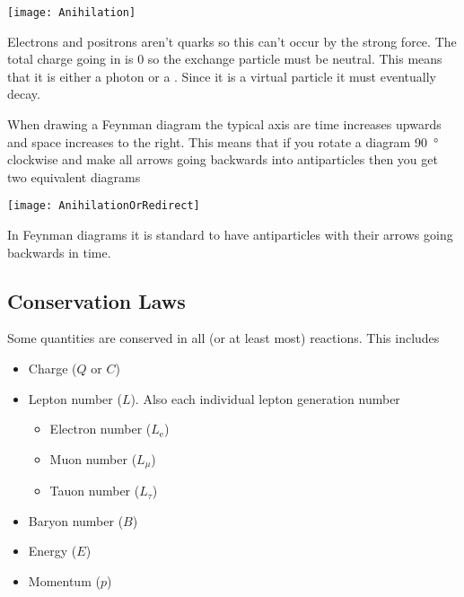 \begin{center}
\texttt{[image: Anihilation]}
\end{center}

Electrons and positrons aren't quarks so this can't occur by the strong force. The total charge going in is 0 so the exchange particle must be neutral. This means that it is either a photon or a \zboson. Since it is a virtual particle it must eventually decay.

When drawing a Feynman diagram the typical axis are time increases upwards and space increases to the right. This means that if you rotate a diagram \SI{90}{\degree} clockwise and make all arrows going backwards into antiparticles then you get two equivalent diagrams

\begin{center}
\texttt{[image: AnihilationOrRedirect]}
\end{center}

In Feynman diagrams it is standard to have antiparticles with their arrows going backwards in time.

\subsection*{Conservation Laws}

Some quantities are conserved in all (or at least most) reactions. This includes
\begin{itemize}
\item Charge (\(Q\) or \(C\))
\item Lepton number (\(L\)). Also each individual lepton generation number
\begin{itemize}
\item Electron number (\(L_\mathrm{e}\))
\item Muon number (\(L_\mu\))
\item Tauon number (\(L_\tau\))
\end{itemize}
\item Baryon number (\(B\))
\item Energy (\(E\))
\item Momentum (\(p\))
\end{itemize}

